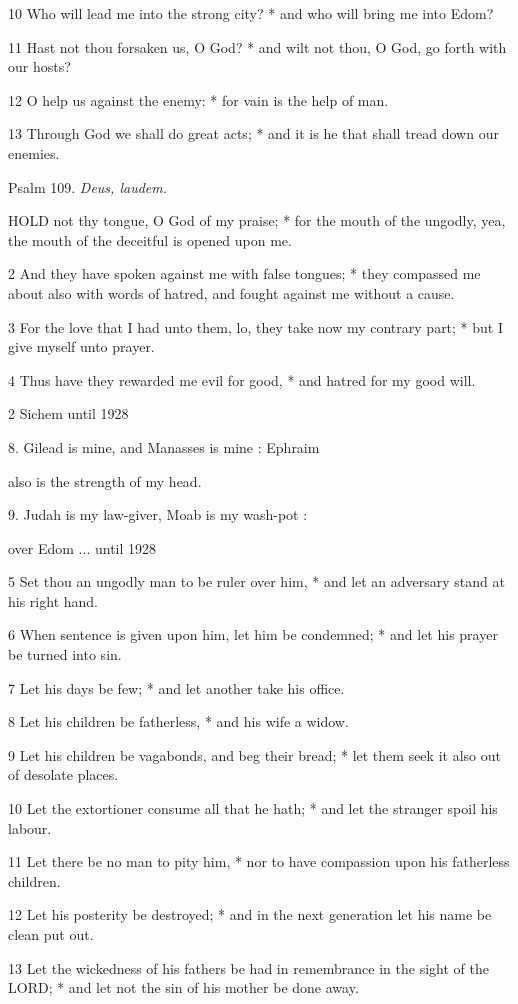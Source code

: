 10 Who will lead me into the strong city? * and who
will bring me into Edom?

11 Hast not thou forsaken us, O God? * and wilt not
thou, O God, go forth with our hosts?

12 O help us against the enemy: * for vain is the help
of man.

13 Through God we shall do great acts; * and it is
he that shall tread down our enemies.

Psalm
109. \emph{Deus, laudem.}

HOLD
not thy tongue, O God of my praise; * for the mouth of the ungodly, yea,
the mouth of the deceitful is opened upon me.

2 And they have spoken against me with false tongues;
* they compassed me about also with words of hatred, and fought against
me without a cause.

3 For the love that I had unto them, lo, they take
now my contrary part; * but I give myself unto prayer.

4 Thus have they rewarded me evil for good, * and hatred
for my good will.

2 Sichem
until
1928

8. Gilead is mine, and Manasses is mine : Ephraim

also is the strength of my head.

9. Judah is my law-giver, Moab is my wash-pot :

over Edom ...
until 1928

5 Set thou an ungodly man to be ruler over him, * and let an adversary stand
at his right hand.

6 When sentence is given upon him, let him be condemned;
* and let his prayer be turned into sin.

7 Let his days be few; * and let another take his office.

8 Let his children be fatherless, * and his wife a widow.

9 Let his children be vagabonds, and beg their bread;
* let them seek it also out of desolate places.

10 Let the extortioner consume all that he hath; * and
let the stranger spoil his labour.

11 Let there be no man to pity him, * nor to have compassion
upon his fatherless children.

12 Let his posterity be destroyed; * and in the next
generation let his name be clean put out.

13 Let the wickedness of his fathers be had in remembrance
in the sight of the LORD; * and let not the sin of his mother be done away.


